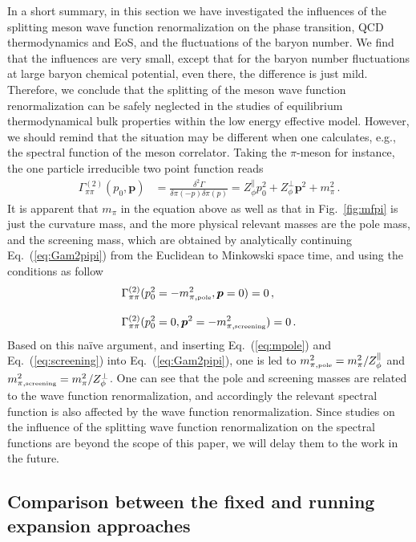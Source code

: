 \documentclass[%
reprint,
superscriptaddress,
showpacs,preprintnumbers,
 amsmath,amssymb,
 aps,
prd,
]{revtex4-1}
\def\Fig#1{Fig.~\ref{#1}} \def\Tab#1{Tab.~\ref{#1}}
\def\Eq#1{Eq.~(\ref{#1})}
\begin{document}
In a short summary,  in this section we have investigated the influences of the splitting meson wave function renormalization on the phase transition, QCD thermodynamics and EoS, and the fluctuations of the baryon number. We find that the influences are very small, except that for the baryon number fluctuations at large baryon chemical potential, even there, the difference is just mild. Therefore, we conclude that the splitting of the meson wave function renormalization can be safely neglected in the studies of equilibrium thermodynamical bulk properties within the low energy effective model. However, we should remind that the situation may be different when one calculates, e.g., the spectral function of the meson correlator. Taking the $\pi$-meson for instance, the one particle irreducible two point function reads
\begin{align}
  \Gamma^{(2)}_{\pi \pi}(p_0, \bm{p})&=\frac{\delta^2 \Gamma}{\delta \pi(-p) \delta \pi(p)}= Z_{\phi}^{\parallel} p_0^2+Z_{\phi}^{\perp}\bm{p}^2+m_\pi^2\,.\label{eq:Gam2pipi}
\end{align}
It is apparent that $m_\pi$ in the equation above as well as that in \Fig{fig:mfpi} is just the curvature mass, and the more physical relevant masses are the pole mass, and the screening mass, which are obtained by analytically continuing \Eq{eq:Gam2pipi} from the Euclidean to Minkowski space time, and using the conditions as follow
\begin{align}
  &\Gamma^{(2)}_{\pi \pi}(p_0^2=-m_{\pi,\text{\tiny{pole}}}^2, \bm{p}=0)=0\,, \label{eq:mpole}\\[2ex]
  &\Gamma^{(2)}_{\pi \pi}(p_0^2=0, \bm{p}^2=-m_{\pi,\text{\tiny{screening}}}^2)=0\,. \label{eq:screening}
\end{align}
Based on this na\"ive argument, and inserting \Eq{eq:mpole} and \Eq{eq:screening} into \Eq{eq:Gam2pipi}, one is led to $m_{\pi,\text{\tiny{pole}}}^2=m_\pi^2/Z_{\phi}^{\parallel}$ and $m_{\pi,\text{\tiny{screening}}}^2=m_\pi^2/Z_{\phi}^{\perp}$. One can see that the pole and screening masses are related to the wave function renormalization, and accordingly the relevant spectral function is also affected by the wave function renormalization. Since studies on the influence of the splitting wave function renormalization on the spectral functions are beyond the scope of this paper, we will delay them to the work in the future.

\subsection{Comparison between the fixed and running expansion approaches}
\label{sec:expansion}
\end{document}
